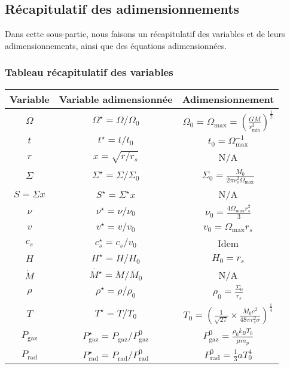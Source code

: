 \subsection{Récapitulatif des adimensionnements}

Dans cette sous-partie, nous faisons un récapitulatif des variables et de leurs adimensionnements, ainsi que des équations adimensionnées.

\subsubsection{Tableau récapitulatif des variables}

\begin{center}
    \begin{tabular}{|c|c|c|}
        \hline
        Variable & Variable adimensionnée & Adimensionnement \\
        \hline
        $\Omega$ & $\Omega^\star = \Omega/\Omega_0$ & $\Omega_0 = \Omega_\mathrm{max} = \left( \frac{G M}{r^3_\mathrm{min}} \right)^\frac{1}{2}$ \\
        $t$ & $t^\star = t/t_0$ & $t_0 = \Omega_\mathrm{max}^{-1}$ \\
        $r$ & $x = \sqrt{r/r_s}$ & N/A \\
        $\Sigma$ & $\Sigma^\star = \Sigma/\Sigma_0$ & $\Sigma_0 = \frac{\dot{M_0}}{2 \pi r_s^2 \Omega_\mathrm{max}}$ \\
        $S = \Sigma x$ & $S^\star = \Sigma^\star x$ & N/A \\
        $\nu$ & $\nu^\star = \nu/\nu_0$ & $\nu_0 = \frac{4 \Omega_\mathrm{max} r_s^2}{3}$ \\
        $v$ & $v^\star = v/v_0$ & $v_0 = \Omega_\mathrm{max} r_s$ \\
        $c_s$ & $c_s^\star = c_s/v_0$ & Idem \\
        $H$ & $H^\star = H/H_0$ & $H_0 = r_s$ \\
        $\dot{M}$ & $\dot{M^\star} = \dot{M}/\dot{M_0}$ & N/A \\
        $\rho$ & $\rho^\star = \rho/\rho_0$ & $\rho_0 = \frac{\Sigma_0}{r_s}$ \\
        $T$ & $T^\star = T/T_0$ & $T_0 = \left(\frac{1}{\sqrt{27}} \times \frac{\dot{M_0} c^2}{48 \pi r_s^2 \sigma} \right)^\frac{1}{4}$ \\
        $P_\mathrm{gaz}$ & $P_\mathrm{gaz}^\star = P_\mathrm{gaz}/P_\mathrm{gaz}^0$ & $P_\mathrm{gaz}^0 = \frac{\rho_0 k_B T_0}{\mu m_p}$ \\
        $P_\mathrm{rad}$ & $P_\mathrm{rad}^\star = P_\mathrm{rad}/P_\mathrm{rad}^0$ & $P_\mathrm{rad}^0 = \frac{1}{3} a T_0^4$ \\
        \hline
    \end{tabular}
\end{center}

